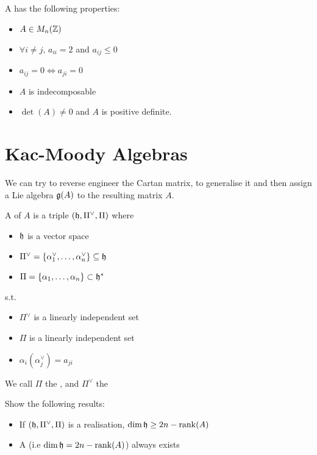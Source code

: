 \documentclass{article}
\begin{document}
\begin{prop}
A has the following properties: 
\begin{itemize}
    \item $A \in M_n(\mathbb{Z})$ 
    \item $\forall i \neq j, \, a_{ii}=2 $ and $a_{ij}\leq 0$ 
    \item $a_{ij}=0 \Leftrightarrow a_{ji}=0$ 
    \item $A$ is indecomposable
    \item $\det(A) \neq 0$ and $A$ is positive definite. 
\end{itemize}
\end{prop}

\section{Kac-Moody Algebras}

\begin{idea}
We can try to reverse engineer the Cartan matrix, to generalise it and then assign a Lie algebra $\mathfrak{g}(A)$ to the resulting matrix $A$. 
\end{idea}

\begin{definition}
A  of $A$ is a triple $ (\mathfrak{h},\Pi^\vee,\Pi)$ where
\begin{itemize}
    \item $\mathfrak{h}$ is a vector space 
    \item $\Pi^\vee = \left\{ \alpha_1^\vee, \dots, \alpha^\vee_n \right\} \subseteq \mathfrak{h}$ 
    \item $\Pi = \left\{ \alpha_1, \dots, \alpha_n \right\} \subset \mathfrak{h}^\ast$
\end{itemize}
s.t. 
\begin{itemize}
    \item $\Pi^\vee$ is a linearly independent set 
    \item $\Pi$ is a linearly independent set 
    \item $\alpha_i(\alpha_j^\vee) = a_{ji}$
\end{itemize}
We call $\Pi$ the , and $\Pi^\vee$ the 
\end{definition}

\begin{ex}
Show the following results: 
\begin{itemize}
    \item If $(\mathfrak{h},\Pi^\vee,\Pi)$ is a realisation, $\dim \mathfrak{h} \geq 2n-\operatorname{rank}(A)$
    \item A  (i.e $\dim \mathfrak{h} = 2n-\operatorname{rank}(A)$) always exists
\end{itemize}
\end{ex}
\end{document}
